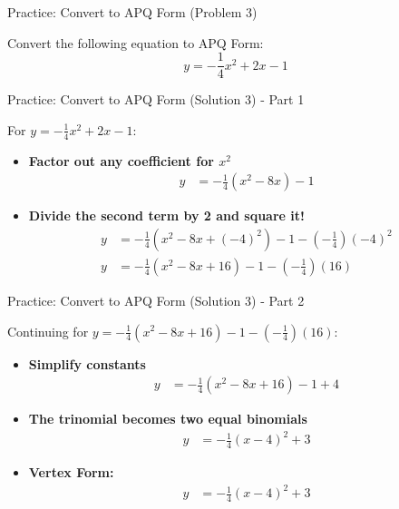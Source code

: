 \documentclass[aspectratio=169]{beamer}
\begin{document}
\begin{frame}{Practice: Convert to APQ Form (Problem 3)}
    \begin{tcolorbox}[colback=lightgray,colframe=primary,title=Problem 3]
        \footnotesize
        Convert the following equation to APQ Form:
        \[ y = -\frac{1}{4}x^2 + 2x - 1 \]
    \end{tcolorbox}
\end{frame}

\begin{frame}{Practice: Convert to APQ Form (Solution 3) - Part 1}
    \begin{tcolorbox}[colback=lightgray,colframe=accent,title=Solution 3 - Part 1]
        \footnotesize
        For $y = -\frac{1}{4}x^2 + 2x - 1$:
        \begin{itemize}
            \item \textbf{Factor out any coefficient for $x^2$}
                \begin{align*}
                    y &= -\frac{1}{4}(x^2 - 8x) - 1
                \end{align*}
            \item \textbf{Divide the second term by 2 and square it!}
                \begin{align*}
                    y &= -\frac{1}{4}(x^2 - 8x + (-4)^2) - 1 - \left(-\frac{1}{4}\right)(-4)^2 \\
                    y &= -\frac{1}{4}(x^2 - 8x + 16) - 1 - \left(-\frac{1}{4}\right)(16)
                \end{align*}
        \end{itemize}
    \end{tcolorbox}
\end{frame}

\begin{frame}{Practice: Convert to APQ Form (Solution 3) - Part 2}
    \begin{tcolorbox}[colback=lightgray,colframe=accent,title=Solution 3 - Part 2 (Cont.)]
        \footnotesize
        Continuing for $y = -\frac{1}{4}(x^2 - 8x + 16) - 1 - \left(-\frac{1}{4}\right)(16)$:
        \begin{itemize}
            \item \textbf{Simplify constants}
                \begin{align*}
                    y &= -\frac{1}{4}(x^2 - 8x + 16) - 1 + 4
                \end{align*}
            \item \textbf{The trinomial becomes two equal binomials}
                \begin{align*}
                    y &= -\frac{1}{4}(x-4)^2 + 3
                \end{align*}
            \item \textbf{Vertex Form:}
                \begin{align*}
                    y &= -\frac{1}{4}(x-4)^2 + 3
                \end{align*}
        \end{itemize}
    \end{tcolorbox}
\end{frame}
\end{document}
